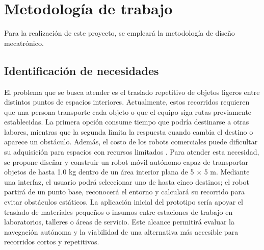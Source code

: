 %
%

\chapter{Metodología de trabajo}
\label{cap:proto-metodologia}


Para la realización de este proyecto, se empleará la metodología de diseño mecatrónico.

\section{Identificación de necesidades}
\label{sec:id-necesidades}

El problema que se busca atender es el traslado repetitivo de objetos ligeros entre distintos puntos de espacios interiores. Actualmente, estos recorridos requieren que una persona transporte cada objeto o que el equipo siga rutas previamente establecidas. La primera opción consume tiempo que podría destinarse a otras labores, mientras que la segunda limita la respuesta cuando cambia el destino o aparece un obstáculo. Además, el costo de los robots comerciales puede dificultar su adquisición para espacios con recursos limitados \cite{EDA1}.
Para atender esta necesidad, se propone diseñar y construir un robot móvil autónomo capaz de transportar objetos de hasta 1.0 kg dentro de un área interior plana de 5 × 5 m. Mediante una interfaz, el usuario podrá seleccionar uno de hasta cinco destinos; el robot partirá de un punto base, reconocerá el entorno y calculará su recorrido para evitar obstáculos estáticos. La aplicación inicial del prototipo sería apoyar el traslado de materiales pequeños o insumos entre estaciones de trabajo en laboratorios, talleres o áreas de servicio. Este alcance permitirá evaluar la navegación autónoma y la viabilidad de una alternativa más accesible para recorridos cortos y repetitivos.

